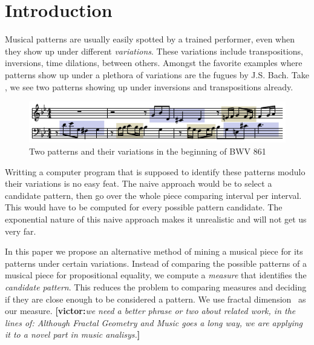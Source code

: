 \newcommand{\victor}[1]{{\color{blue}\textbf{[victor:}\textit{#1}\textbf{]}}}

\section{Introduction}
\label{sec:intro}

  Musical patterns are usually easily spotted by a trained performer,
even when they show up under different \emph{variations}.  These
variations include transpositions, inversions, time dilations, between
others. Amongst the favorite examples where patterns show up under a
plethora of variations are the fugues by J.S. Bach. Take
, we see two patterns showing up under
inversions and transpositions already.

\begin{figure}
  \includegraphics[width=\linewidth]{src/img/bwv861-start-section-patterns.pdf}
  \caption{Two patterns and their variations in the beginning of BWV 861}
  \label{fig:egbach}
\end{figure}

  Writting a computer program that is supposed to identify these
patterns modulo their variations is no easy feat. The naive approach
would be to select a candidate pattern, then go over the whole
piece comparing interval per interval. This would have to be computed
for every possible pattern candidate. The exponential nature of this
naive approach makes it unrealistic and will not get us very far.

  In this paper we propose an alternative method of mining a musical
piece for its patterns under certain variations. Instead of comparing 
the possible patterns of a musical piece for propositional equality, 
we compute a \emph{measure} that identifies the \emph{candidate pattern}.
This reduces the problem to comparing measures and deciding if they are
close enough to be considered a pattern. We use fractal dimension~\cite{fractaldimension}
as our measure. \victor{we need a better phrase or two about related
work, in the lines of: Although Fractal Geometry and Music goes a long way\cite{bigerelle2000fractal,hsu1990fractal,hsu1991self},
we are applying it to a novel part in music analisys.}

